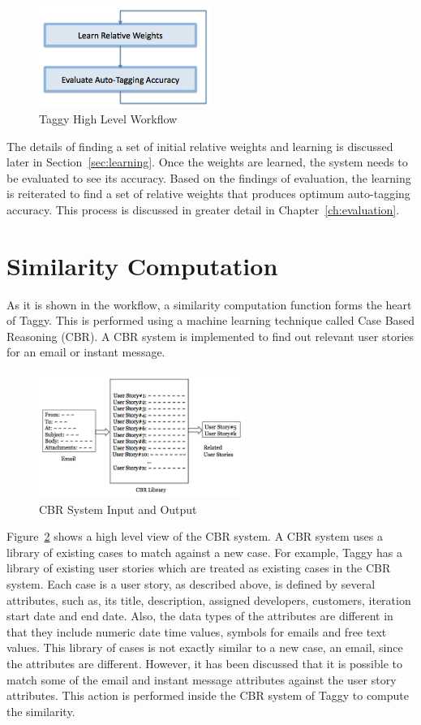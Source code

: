 \begin{figure}[!h]
	\centering
	\includegraphics[width=0.5\textwidth]{learn_evaluate.png}
	\caption{Taggy High Level Workflow}
	\label{fig:learn_evaluate}
\end{figure}

The details of finding a set of initial relative weights and learning is discussed later in Section~\ref{sec:learning}. Once the weights are learned, the system needs to be evaluated to see its accuracy. Based on the findings of evaluation, the learning is reiterated to find a set of relative weights that produces optimum auto-tagging accuracy. This process is discussed in greater detail in Chapter~\ref{ch:evaluation}.

\section{Similarity Computation}
As it is shown in the workflow, a similarity computation function forms the heart of Taggy. This is performed using a machine learning technique called Case Based Reasoning (CBR). A CBR system is implemented to find out relevant user stories for an email or instant message. 

\begin{figure}[!h]
	\centering
	\includegraphics[width=0.6\textwidth]{CBR.png}
    \caption{CBR System Input and Output}
	\label{fig:CBR}
\end{figure}

Figure~\ref{fig:CBR}  shows a high level view of the CBR system. A CBR system uses a library of existing cases to match against a new case. For example, Taggy has a library of existing user stories which are treated as existing cases in the CBR system. Each case is a user story, as described above, is defined by several attributes, such as, its title, description, assigned developers, customers, iteration start date and end date. Also, the data types of the attributes are different in that they include numeric date time values, symbols for emails and free text values. This library of cases is not exactly similar to a new case, an email, since the attributes are different. However, it has been discussed that it is possible to match some of the email and instant message attributes against the user story attributes. This action is performed inside the CBR system of Taggy to compute the similarity.



